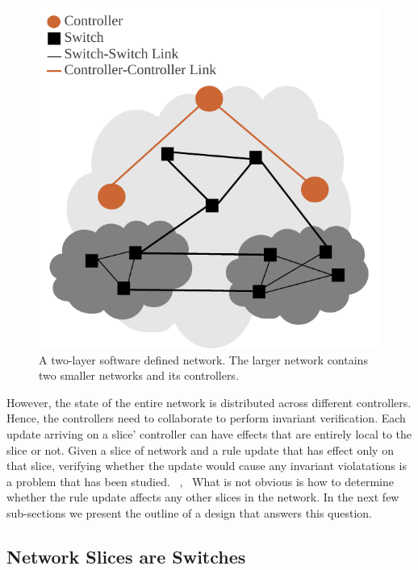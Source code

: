 \documentclass[conference]{IEEEtran}
\begin{document}
 \begin{figure}[h]
 \centering
 \includegraphics[scale=0.8]{network_view}
 \caption{A two-layer software defined network. The larger network contains two smaller networks and its controllers.}
 \label{fig:network_view}
 \end{figure}


However, the state of the entire network is distributed across different controllers. Hence, the controllers need to collaborate to perform invariant verification. Each update arriving on a slice' controller can have effects that are entirely local to the slice or not. Given a slice of network and a rule update that has effect only on that slice, verifying whether the update would cause any invariant violatations is a problem that has been studied. ~\cite{veriflownsdi},~\cite{netplumber} What is not obvious is how to determine whether the rule update affects any other slices in the network. In the next few sub-sections we present the outline of a design that answers this question. 

\subsection{Network Slices are Switches}
\end{document}
